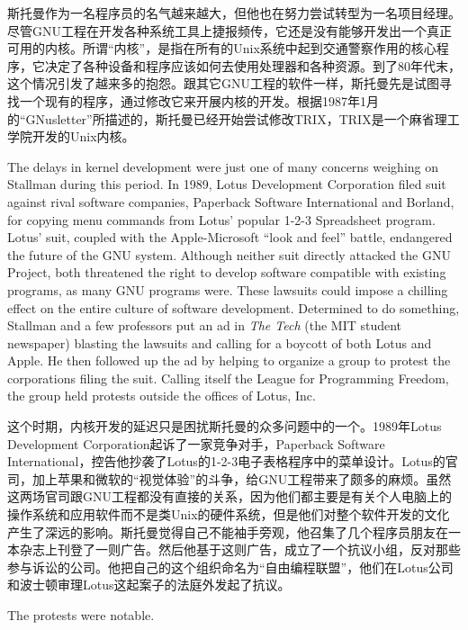 \ifdefined\chs
斯托曼作为一名程序员的名气越来越大，但他也在努力尝试转型为一名项目经理。尽管GNU工程在开发各种系统工具上捷报频传，它还是没有能够开发出一个真正可用的内核。所谓“内核”，是指在所有的Unix系统中起到交通警察作用的核心程序，它决定了各种设备和程序应该如何去使用处理器和各种资源。到了80年代末，这个情况引发了越来多的抱怨。跟其它GNU工程的软件一样，斯托曼先是试图寻找一个现有的程序，通过修改它来开展内核的开发。根据1987年1月的“GNusletter”所描述的，斯托曼已经开始尝试修改TRIX，TRIX是一个麻省理工学院开发的Unix内核。
\fi

\ifdefined\eng
The delays in kernel development were just one of many concerns weighing on Stallman during this period. In 1989, Lotus Development Corporation filed suit against rival software companies, Paperback Software International and Borland, for copying menu commands from Lotus' popular 1-2-3 Spreadsheet program. Lotus' suit, coupled with the Apple-Microsoft ``look and feel'' battle, endangered the future of the GNU system. Although neither suit directly attacked the GNU Project, both threatened the right to develop software compatible with existing programs, as many GNU programs were.  These lawsuits could impose a chilling effect on the entire culture of software development. Determined to do something, Stallman and a few professors put an ad in \textit{The Tech} (the MIT student newspaper) blasting the lawsuits and calling for a boycott of both Lotus and Apple. He then followed up the ad by helping to organize a group to protest the corporations filing the suit. Calling itself the League for Programming Freedom, the group held protests outside the offices of Lotus, Inc.
\fi

\ifdefined\chs
这个时期，内核开发的延迟只是困扰斯托曼的众多问题中的一个。1989年Lotus Development Corporation起诉了一家竞争对手，Paperback Software International，控告他抄袭了Lotus的1-2-3电子表格程序中的菜单设计。Lotus的官司，加上苹果和微软的“视觉体验”的斗争，给GNU工程带来了颇多的麻烦。虽然这两场官司跟GNU工程都没有直接的关系，因为他们都主要是有关个人电脑上的操作系统和应用软件而不是类Unix的硬件系统，但是他们对整个软件开发的文化产生了深远的影响。斯托曼觉得自己不能袖手旁观，他召集了几个程序员朋友在一本杂志上刊登了一则广告。然后他基于这则广告，成立了一个抗议小组，反对那些参与诉讼的公司。他把自己的这个组织命名为“自由编程联盟”，他们在Lotus公司和波士顿审理Lotus这起案子的法庭外发起了抗议。
\fi

\ifdefined\eng
The protests were notable.
\fi


